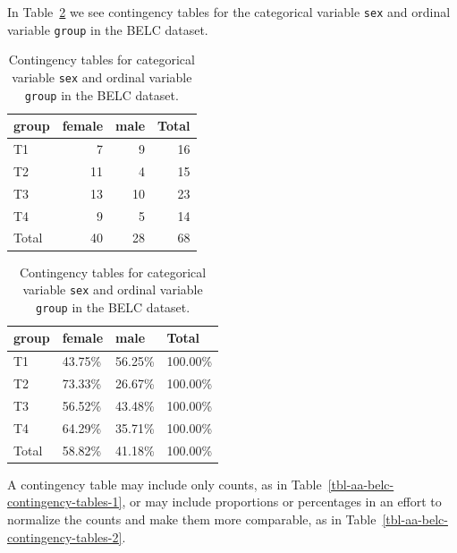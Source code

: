 \documentclass[
  letterpaper,
  DIV=11,
  numbers=noendperiod]{scrreport}
\theoremstyle{definition}
\theoremstyle{remark}
\begin{document}
In Table~\ref{tbl-aa-belc-contingency-tables} we see contingency tables
for the categorical variable \texttt{sex} and ordinal variable
\texttt{group} in the BELC dataset.

\begin{table}

\caption{\label{tbl-aa-belc-contingency-tables}Contingency tables for
categorical variable \texttt{sex} and ordinal variable \texttt{group} in
the BELC dataset.}\begin{minipage}[t]{0.50\linewidth}

{\centering 

\begin{tabular}[t]{lrrr}
\toprule
group & female & male & Total\\
\midrule
T1 & 7 & 9 & 16\\
T2 & 11 & 4 & 15\\
T3 & 13 & 10 & 23\\
T4 & 9 & 5 & 14\\
Total & 40 & 28 & 68\\
\bottomrule
\end{tabular}

}

\end{minipage}%
%
\begin{minipage}[t]{0.50\linewidth}

{\centering 

\begin{tabular}[t]{llll}
\toprule
group & female & male & Total\\
\midrule
T1 & 43.75\% & 56.25\% & 100.00\%\\
T2 & 73.33\% & 26.67\% & 100.00\%\\
T3 & 56.52\% & 43.48\% & 100.00\%\\
T4 & 64.29\% & 35.71\% & 100.00\%\\
Total & 58.82\% & 41.18\% & 100.00\%\\
\bottomrule
\end{tabular}

}

\end{minipage}%

\end{table}

A contingency table may include only counts, as in
Table~\ref{tbl-aa-belc-contingency-tables-1}, or may include proportions
or percentages in an effort to normalize the counts and make them more
comparable, as in Table~\ref{tbl-aa-belc-contingency-tables-2}.
\end{document}
